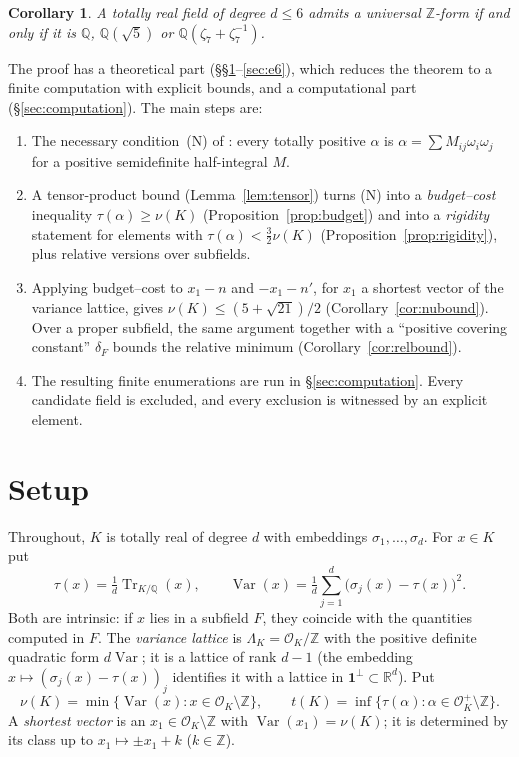 \documentclass[11pt]{amsart}
\newtheorem{corollary}[theorem]{Corollary}
\theoremstyle{definition}
\DeclareMathOperator{\Tr}{Tr}
\DeclareMathOperator{\Var}{Var}
\newcommand{\OK}{\mathcal{O}_K}
\newcommand{\Q}{\mathbb{Q}}
\newcommand{\Z}{\mathbb{Z}}
\newcommand{\R}{\mathbb{R}}
\newcommand{\LamK}{\Lambda_K}
\begin{document}
\begin{corollary}\label{cor:le6}
A totally real field of degree $d\le 6$ admits a universal $\Z$-form if and only if it is
$\Q$, $\Q(\sqrt5)$ or $\Q(\zeta_7+\zeta_7^{-1})$.
\end{corollary}

The proof has a theoretical part (\S\S\ref{sec:setup}--\ref{sec:e6}), which reduces the
theorem to a finite computation with explicit bounds, and a computational part
(\S\ref{sec:computation}).  The main steps are:
\begin{enumerate}[label=(\roman*)]
\item The necessary condition~(N) of \cite{KY1}: every totally positive $\alpha$ is
  $\alpha=\sum M_{ij}\omega_i\omega_j$ for a positive semidefinite half-integral $M$.
\item A tensor-product bound (Lemma~\ref{lem:tensor}) turns (N) into a \emph{budget--cost}
  inequality $\tau(\alpha)\ge\nu(K)$ (Proposition~\ref{prop:budget}) and into a
  \emph{rigidity} statement for elements with $\tau(\alpha)<\frac32\nu(K)$
  (Proposition~\ref{prop:rigidity}), plus relative versions over subfields.
\item Applying budget--cost to $x_1-n$ and $-x_1-n'$, for $x_1$ a shortest vector of the variance
  lattice, gives $\nu(K)\le(5+\sqrt{21})/2$ (Corollary~\ref{cor:nubound}).  Over a proper
  subfield, the same argument together with a ``positive covering constant'' $\delta_F$ bounds
  the relative minimum (Corollary~\ref{cor:relbound}).
\item The resulting finite enumerations are run in \S\ref{sec:computation}.  Every candidate
  field is excluded, and every exclusion is witnessed by an explicit element.
\end{enumerate}

\section{Setup}\label{sec:setup}

Throughout, $K$ is totally real of degree $d$ with embeddings $\sigma_1,\dots,\sigma_d$.
For $x\in K$ put
\[
\tau(x)=\tfrac1d\Tr_{K/\Q}(x),\qquad
\Var(x)=\tfrac1d\sum_{j=1}^d\bigl(\sigma_j(x)-\tau(x)\bigr)^2 .
\]
Both are intrinsic: if $x$ lies in a subfield $F$, they coincide with the quantities computed
in $F$.  The \emph{variance lattice} is $\LamK=\OK/\Z$ with the positive definite quadratic
form $d\Var$; it is a lattice of rank $d-1$ (the embedding $x\mapsto(\sigma_j(x)-\tau(x))_j$
identifies it with a lattice in $\mathbf 1^\perp\subset\R^d$).  Put
\[
\nu(K)=\min\{\Var(x):x\in\OK\setminus\Z\},\qquad
t(K)=\inf\{\tau(\alpha):\alpha\in\OK^+\setminus\Z\}.
\]
A \emph{shortest vector} is an $x_1\in\OK\setminus\Z$ with $\Var(x_1)=\nu(K)$; it is determined
by its class up to $x_1\mapsto\pm x_1+k$ ($k\in\Z$).
\end{document}
